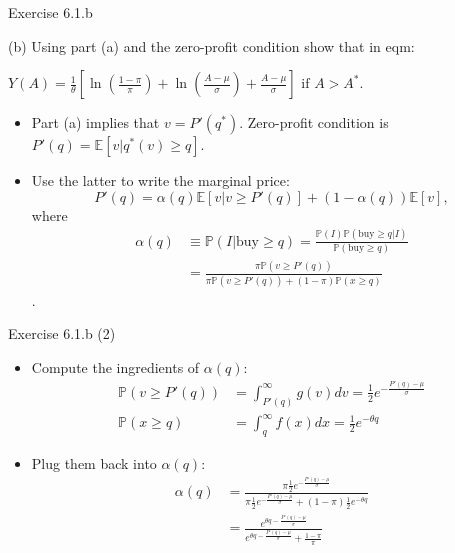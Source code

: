 \documentclass[english,10pt
,aspectratio=169
]{beamer}
\begin{document}
\begin{frame}{Exercise 6.1.b}
	\begin{exampleblock}{}
		(b) Using part (a) and the zero-profit condition show that in eqm:
		\begin{center}
			$
			Y(A)=\frac{1}{\theta} \left[\ln \left(\frac{1-\pi}{\pi}\right) + \ln \left(\frac{A-\mu}{\sigma}\right) + \frac{A-\mu}{\sigma}\right]\text{ if } A>A^*.
			$
		\end{center}
	\end{exampleblock}

	\pause

	\begin{itemize}
		\item Part (a) implies that $v=P'(q^*)$. Zero-profit condition is $P'(q) = \mathbb{E} [v | q^*(v) \geq q]$.
		
		\item Use the latter to write the marginal price:
		\[
			P'(q) = \alpha(q) \mathbb{E}[v|v \ge P'(q)]+(1-\alpha(q))\mathbb{E}[v],
		\]
		where 
		\begin{align*}
			\alpha(q) &\equiv \mathbb{P}(I|\text{buy} \geq q) = \frac{\mathbb{P}(I)\mathbb{P}(\text{buy} \geq q|I) }{\mathbb{P}(\text{buy} \geq q)} 
			\\
			&= \frac{\pi \mathbb{P}(v \ge P'(q))}{\pi \mathbb{P}(v \ge P'(q))+(1-\pi)\mathbb{P}(x \ge q)}
		\end{align*}.
	\end{itemize}
\end{frame}


\begin{frame}{Exercise 6.1.b (2)}
	\begin{itemize}
		\item Compute the ingredients of $\alpha(q)$:
		\begin{align*}
			\mathbb{P}(v \ge P'(q)) 	&=\int_{P'(q)}^\infty g(v) dv = \frac{1}{2} e^{-\frac{P'(q)-\mu}{\sigma}} \\
			\mathbb{P}(x \ge q)	&=\int_q^\infty f(x) dx = \frac{1}{2}e^{-\theta q}
		\end{align*}
		\item Plug them back into $\alpha(q)$:
		\begin{align*}
			\alpha(q)
			& =\frac{\pi \frac{1}{2} e^{-\frac{P'(q)-\mu}{\sigma}}}{\pi \frac{1}{2} e^{-\frac{P'(q)-\mu}{\sigma}} + (1-\pi)\frac{1}{2}e^{-\theta q}} 
			\\
			& = \frac{e^{\theta q-\frac{P'(q)-\mu}{\sigma}}}{e^{\theta q-\frac{P'(q)-\mu }{\sigma}} + \frac{1-\pi}{\pi}} 
		\end{align*}
	\end{itemize}
\end{frame}
\end{document}
